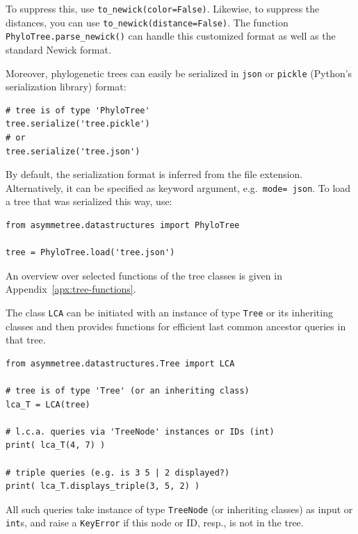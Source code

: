 \documentclass[hidelinks,11pt]{article}
\newcommand{\sq}{\textquotesingle}
\begin{document}
\noindent
To suppress this, use \texttt{to\_newick(color=False)}. Likewise, to suppress the distances, you can use \texttt{to\_newick(distance=False)}.
The function \texttt{PhyloTree.parse\_newick()} can handle this customized format as well as the standard Newick format.

Moreover, phylogenetic trees can easily be serialized in \texttt{json} or \texttt{pickle} (Python's serialization library) format:

\begin{adjustwidth}{1cm}{1cm}\vspace{2mm}
\begin{verbatim}
# tree is of type 'PhyloTree'
tree.serialize('tree.pickle')
# or
tree.serialize('tree.json')
\end{verbatim}
\end{adjustwidth}

\noindent
By default, the serialization format is inferred from the file extension.
Alternatively, it can be specified as keyword argument, e.g.\ \texttt{mode=\sq
json\sq}.
To load a tree that was serialized this way, use:

\begin{adjustwidth}{1cm}{1cm}\vspace{2mm}
\begin{verbatim}
from asymmetree.datastructures import PhyloTree

tree = PhyloTree.load('tree.json')
\end{verbatim}
\end{adjustwidth}

An overview over selected functions of the tree classes is given in 
Appendix~\ref{apx:tree-functions}.

The class \texttt{LCA} can be initiated with an instance of type \texttt{Tree} 
or its inheriting classes and then provides functions for efficient last common 
ancestor queries in that tree. 

\begin{adjustwidth}{1cm}{1cm}\vspace{2mm}
\begin{verbatim}
from asymmetree.datastructures.Tree import LCA

# tree is of type 'Tree' (or an inheriting class)
lca_T = LCA(tree)

# l.c.a. queries via 'TreeNode' instances or IDs (int)
print( lca_T(4, 7) )

# triple queries (e.g. is 3 5 | 2 displayed?)
print( lca_T.displays_triple(3, 5, 2) )
\end{verbatim}
\end{adjustwidth}
All such queries take instance of type \texttt{TreeNode} (or inheriting 
classes) as 
input or \texttt{int}s, and raise a \texttt{KeyError} if this node or ID, 
resp., is not in the tree.
\end{document}
